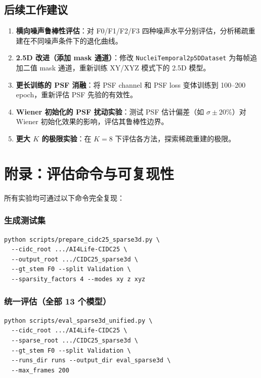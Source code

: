 \documentclass[UTF8, scheme=plain, 11pt, a4paper]{ctexart}
\begin{document}
\subsection{后续工作建议}

\begin{enumerate}[leftmargin=*, label=\textbf{后续\arabic*.}]
  \item \textbf{横向噪声鲁棒性评估}：对 F0/F1/F2/F3 四种噪声水平分别评估，分析稀疏重建在不同噪声条件下的退化曲线。
  \item \textbf{2.5D 改进（添加 mask 通道）}：修改 \texttt{NucleiTemporal2p5DDataset} 为每帧追加二值 mask 通道，重新训练 XY/XYZ 模式下的 2.5D 模型。
  \item \textbf{更长训练的 PSF 消融}：将 PSF channel 和 PSF loss 变体训练到 100--200 epoch，重新评估 PSF 先验的有效性。
  \item \textbf{Wiener 初始化的 PSF 扰动实验}：测试 PSF 估计偏差（如 $\sigma \pm 20\%$）对 Wiener 初始化效果的影响，评估其鲁棒性边界。
  \item \textbf{更大 $K$ 的极限实验}：在 $K=8$ 下评估各方法，探索稀疏重建的极限。
\end{enumerate}

\section*{附录：评估命令与可复现性}

所有实验均可通过以下命令完全复现：

\subsubsection*{生成测试集}
\begin{verbatim}
python scripts/prepare_cidc25_sparse3d.py \
  --cidc_root .../AI4Life-CIDC25 \
  --output_root .../CIDC25_sparse3d \
  --gt_stem F0 --split Validation \
  --sparsity_factors 4 --modes xy z xyz
\end{verbatim}

\subsubsection*{统一评估（全部 13 个模型）}
\begin{verbatim}
python scripts/eval_sparse3d_unified.py \
  --cidc_root .../AI4Life-CIDC25 \
  --sparse_root .../CIDC25_sparse3d \
  --gt_stem F0 --split Validation \
  --runs_dir runs --output_dir eval_sparse3d \
  --max_frames 200
\end{verbatim}
\end{document}
